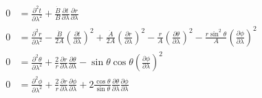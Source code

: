 \begin{subequations}
    \begin{align}
        0 & = \frac{\partial^2 t}{\partial \lambda^2} +
        \frac{\dot{B}}{B}
        \frac{\partial t}{\partial \lambda}\frac{\partial r}{\partial \lambda}       \\
        0 & = \frac{\partial^2 r}{\partial \lambda^2} -
        \frac{\dot{B}}{2A}\left(\frac{\partial t}{\partial \lambda}\right)^2 +
        \frac{\dot{A}}{2A}\left(\frac{\partial r}{\partial \lambda}\right)^2 -
        \frac{r}{A}\left(\frac{\partial \theta}{\partial \lambda}\right)^2 -
        \frac{r\sin^2\theta}{A}\left(\frac{\partial \phi}{\partial \lambda}\right)^2 \\
        0 & = \frac{\partial^2 \theta}{\partial \lambda^2} +
        \frac{2}{r} \frac{\partial r}{\partial \lambda}\frac{\partial \theta}{\partial \lambda} -
        \sin\theta\cos\theta \left(\frac{\partial \phi}{\partial \lambda}\right)^2   \\
        0 & = \frac{\partial^2 \phi}{\partial \lambda^2} +
        \frac{2}{r} \frac{\partial r}{\partial \lambda}\frac{\partial \phi}{\partial \lambda} +
        2\frac{\cos\theta}{\sin\theta} \frac{\partial \theta}{\partial \lambda}\frac{\partial \phi}{\partial \lambda}
    \end{align}
\end{subequations}